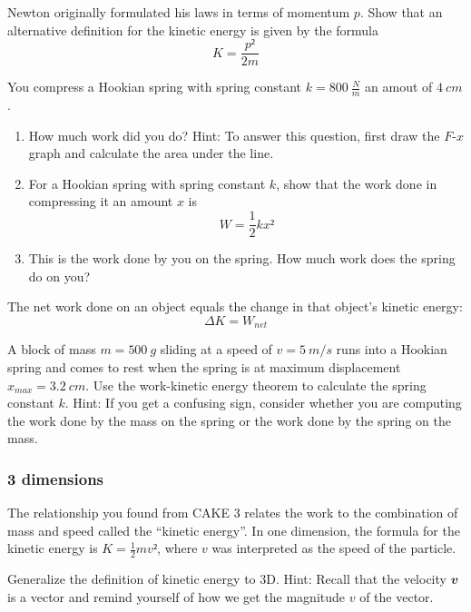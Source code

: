 \begin{exercise}
Newton originally formulated his laws in terms of momentum $p$. Show that an alternative definition for the kinetic energy is given by the formula 
$$
K= \frac {p²}{2m}
$$
\end{exercise}

\begin{exercise}
You compress a Hookian spring with spring constant $k = 800\ \frac Nm$ an amout of $4\ cm$. 
\begin{enumerate}
\item How much work did you do? Hint: To answer this question, first draw the $F$-$x$ graph and calculate the area under the line. 
\item For a Hookian spring with spring constant $k$, show that the work done in compressing it an amount $x$ is 
$$
W = \frac12 kx² 
$$
\item This is the work done by you on the spring. How much work does the spring do on you?
\end{enumerate}
\end{exercise}

\begin{theorem}
The net work done on an object equals the change in that object's kinetic energy:
$$
ΔK = W_{net}
$$
\end{theorem}

\begin{exercise}
A block of mass $m= 500\ g$ sliding at a speed of $v= 5\ m/s$ runs into a Hookian spring and comes to rest when the spring is at maximum displacement $x_{max} = 3.2\ cm$. Use the work-kinetic energy theorem to calculate the spring constant $k$. Hint: If you get a confusing sign, consider whether you are computing the work done by the mass on the spring or the work done by the spring on the mass.
\end{exercise}



\subsubsection{3 dimensions}

The relationship you found from CAKE 3 relates the work to the combination of mass and speed called the “kinetic energy”. In one dimension, the formula for the kinetic energy is $K=\frac12 mv²$, where $v$ was interpreted as the speed of the particle. 
\begin{exercise}
Generalize the definition of kinetic energy to 3D. Hint: Recall that the velocity $𝒗$ is a vector and remind yourself of how we get the magnitude $v$ of the vector. 
\end{exercise}


